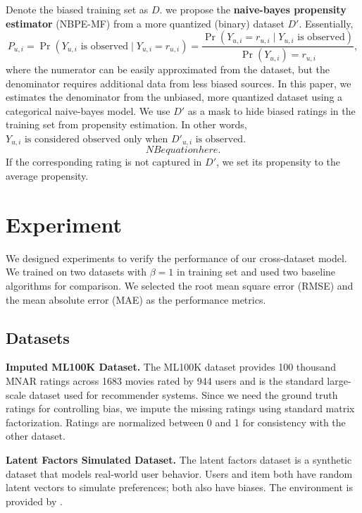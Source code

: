 \documentclass{article}
\begin{document}
Denote the biased training set as $D$. we propose the \textbf{naive-bayes propensity estimator} (NBPE-MF) from a more quantized (binary) dataset $D'$. Essentially,
\begin{equation} 
  P_{u,i} = \Pr(Y_{u,i} \text{ is observed} \mid Y_{u,i} = r_{u,i}) = \frac{\Pr(Y_{u,i} = r_{u,i} \mid Y_{u,i} \text{ is observed})}{\Pr(Y_{u,i}) = r_{u,i}},
\end{equation}
where the numerator can be easily approximated from the dataset, but the denominator requires additional data from less biased sources. In this paper, we estimates the denominator from the unbiased, more quantized dataset using a categorical naive-bayes model. We use $D'$ as a mask to hide biased ratings in the training set from propensity estimation. In other words, $Y_{u,i} \text{ is considered observed}$ only when $D'_{u,i} \text{ is observed}$. 
\begin{equation} 
  NB equation here.
\end{equation}
If the corresponding rating is not captured in $D'$, we set its propensity to the average propensity. 

\section{Experiment}
We designed experiments to verify the performance of our cross-dataset model. We trained on two datasets with $\beta =1$ in training set and used two baseline algorithms for comparison. We selected the root mean square error (RMSE) and the mean absolute error (MAE) as the performance metrics. 

\subsection{Datasets}
\textbf{Imputed ML100K Dataset.}
The ML100K dataset provides 100 thousand MNAR ratings across 1683 movies rated by 944 users and is the standard large-scale dataset used for recommender systems. Since we need the ground truth ratings for controlling bias, we impute the missing ratings using standard matrix factorization. Ratings are normalized between 0 and 1 for consistency with the other dataset. 

\textbf{Latent Factors Simulated Dataset.}
The latent factors dataset is a synthetic dataset that models real-world user behavior. Users and item both have random latent vectors to simulate preferences; both also have biases. The environment is provided by \cite{krauth2020offline}.
\end{document}
